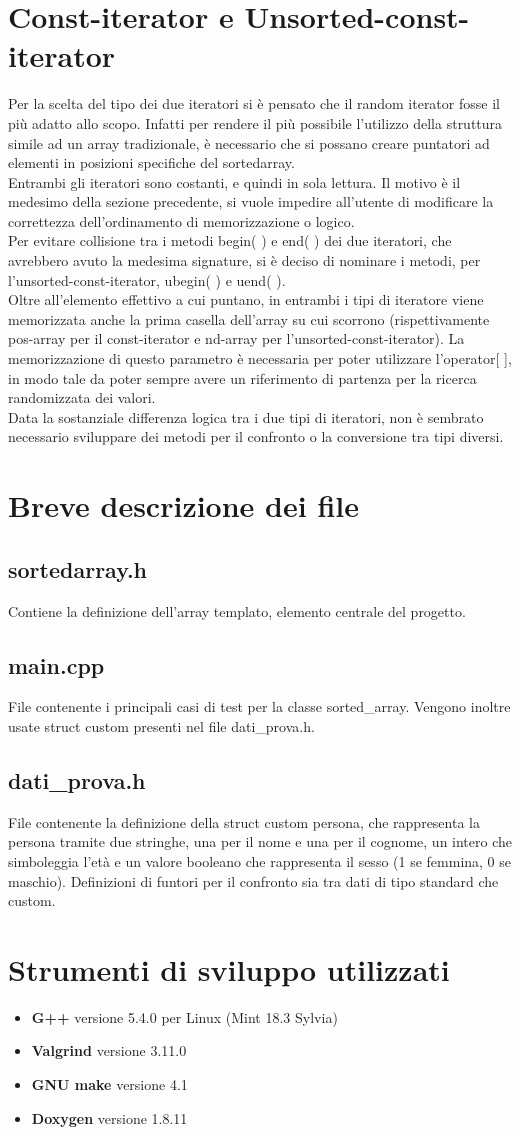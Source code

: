 \documentclass[11pt]{article}
\begin{document}
\section*{Const-iterator e Unsorted-const-iterator}
Per la scelta del tipo dei due iteratori si è pensato che il random iterator fosse il più adatto allo scopo. Infatti per rendere il più possibile l'utilizzo della struttura simile ad un array tradizionale, è necessario che si possano creare puntatori ad elementi in posizioni specifiche del sortedarray.\\
Entrambi gli iteratori sono costanti, e quindi in sola lettura. Il motivo è il medesimo della sezione precedente, si vuole impedire all'utente di modificare la correttezza dell'ordinamento di memorizzazione o logico.\\
Per evitare collisione tra i metodi begin( ) e end( ) dei due iteratori, che avrebbero avuto la medesima signature, 
si è deciso di nominare i metodi, per l'unsorted-const-iterator, ubegin( ) e uend( ).\\
Oltre all'elemento effettivo a cui puntano, in entrambi i tipi di iteratore viene memorizzata anche la prima casella 
dell'array su cui scorrono (rispettivamente pos-array per il const-iterator e nd-array per l'unsorted-const-iterator).
La memorizzazione di questo parametro è necessaria per poter utilizzare l'operator[ ], in modo tale da poter sempre avere un riferimento di partenza per la ricerca randomizzata dei valori.\\
Data la sostanziale differenza logica tra i due tipi di iteratori, non è sembrato necessario sviluppare dei metodi 
per il confronto o la conversione tra tipi diversi.
\section*{Breve descrizione dei file}
\subsection*{sortedarray.h}
Contiene la definizione dell'array templato, elemento centrale del progetto.
\subsection*{main.cpp}
File contenente i principali casi di test per la classe sorted\_array. Vengono inoltre usate struct custom presenti nel file dati\_prova.h.
\subsection*{dati\_prova.h}
File contenente la definizione della struct custom persona, che rappresenta la persona tramite due stringhe, una per 
il nome e una per il cognome, un intero che simboleggia l'età e un valore booleano che rappresenta il sesso 
(1 se femmina, 0 se maschio). Definizioni di funtori per il confronto sia tra dati di tipo standard che custom.
\section*{Strumenti di sviluppo utilizzati}
\begin{itemize}
\item \textbf{G++} versione 5.4.0 per Linux (Mint 18.3 Sylvia)
\item \textbf{Valgrind} versione 3.11.0
\item \textbf{GNU make} versione 4.1
\item \textbf{Doxygen} versione 1.8.11
\end{itemize} 
\end{document}
